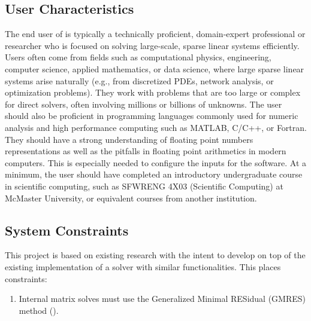 \documentclass[12pt]{article}
\begin{document}
 

\subsection{User Characteristics} \label{SecUserCharacteristics}

The end user of \progname{} is typically a technically proficient, domain-expert
professional or researcher who is focused on solving large-scale, sparse linear
systems efficiently. Users often come from fields such as computational physics,
engineering, computer science, applied mathematics, or data science, where large
sparse linear systems arise naturally (e.g., from discretized PDEs, network
analysis, or optimization problems). They work with problems that are too large
or complex for direct solvers, often involving millions or billions of unknowns.
The user should also be proficient in programming languages commonly used for
numeric analysis and high performance computing such as MATLAB, C/C++, or
Fortran. They should have a strong understanding of floating point numbers
representations as well as the pitfalls in floating point arithmetics in modern
computers. This is especially needed to configure the inputs for the software.
At a minimum, the user should have completed an introductory undergraduate
course in scientific computing, such as SFWRENG 4X03 (Scientific Computing) at
McMaster University, or equivalent courses from another institution.

\subsection{System Constraints}

This project is based on existing research with the intent to develop on top of
the existing implementation of a solver with similar functionalities. This
places constraints:

\begin{enumerate}
\item Internal matrix solves must use the Generalized Minimal RESidual (GMRES)
  method (\cite{lindquist_improving_2020}).
\end{enumerate}
\end{document}
